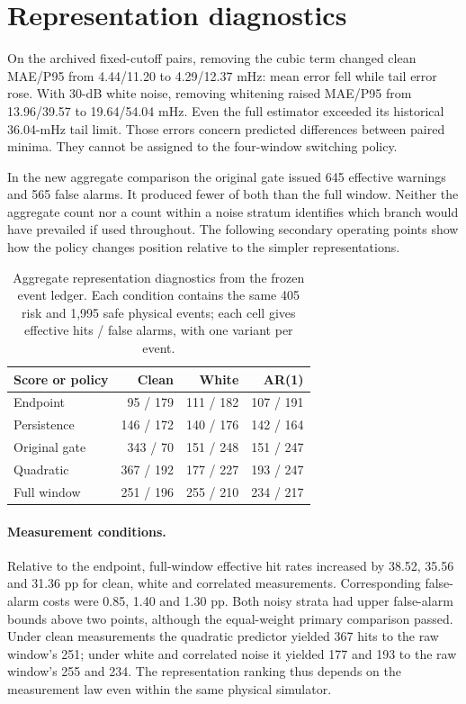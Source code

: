 \documentclass[10pt]{article}
\begin{document}
\section{Representation diagnostics}
On the archived fixed-cutoff pairs, removing the cubic term changed clean MAE/P95 from 4.44/11.20 to 4.29/12.37 mHz: mean error fell while tail error rose. With 30-dB white noise, removing whitening raised MAE/P95 from 13.96/39.57 to 19.64/54.04 mHz. Even the full estimator exceeded its historical 36.04-mHz tail limit. Those errors concern predicted differences between paired minima. They cannot be assigned to the four-window switching policy.

In the new aggregate comparison the original gate issued 645 effective warnings and 565 false alarms. It produced fewer of both than the full window. Neither the aggregate count nor a count within a noise stratum identifies which branch would have prevailed if used throughout. The following secondary operating points show how the policy changes position relative to the simpler representations.
\begin{table}[htbp]\centering\small
\caption{Aggregate representation diagnostics from the frozen event ledger. Each condition contains the same 405 risk and 1,995 safe physical events; each cell gives effective hits / false alarms, with one variant per event.}\label{tab:strata}
\begin{tabular}{lrrr}\toprule Score or policy & Clean & White & AR(1)\\\midrule
Endpoint & 95 / 179 & 111 / 182 & 107 / 191 \\
Persistence & 146 / 172 & 140 / 176 & 142 / 164 \\
Original gate & 343 / 70 & 151 / 248 & 151 / 247 \\
Quadratic & 367 / 192 & 177 / 227 & 193 / 247 \\
Full window & 251 / 196 & 255 / 210 & 234 / 217 \\
\bottomrule\end{tabular}\end{table}
\paragraph{Measurement conditions.}
Relative to the endpoint, full-window effective hit rates increased by 38.52, 35.56 and 31.36 pp for clean, white and correlated measurements. Corresponding false-alarm costs were 0.85, 1.40 and 1.30 pp. Both noisy strata had upper false-alarm bounds above two points, although the equal-weight primary comparison passed. Under clean measurements the quadratic predictor yielded 367 hits to the raw window's 251; under white and correlated noise it yielded 177 and 193 to the raw window's 255 and 234. The representation ranking thus depends on the measurement law even within the same physical simulator.
\end{document}
